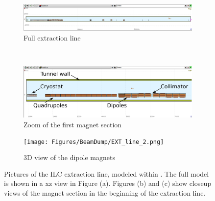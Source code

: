 \begin{figure}[h]
 \centering
  \begin{subfigure}[b]{\textwidth}
   \centering
    \includegraphics[width=\textwidth]{Figures/BeamDump/EXT_line.png}
   \caption{Full extraction line}
   \end{subfigure}\\
   \begin{subfigure}[b]{0.63\textwidth}
   \centering
    \includegraphics[width=\textwidth]{Figures/BeamDump/EXT_line_1.png}
   \caption{Zoom of the first magnet section}
   \end{subfigure}
   \hfill
    \begin{subfigure}[b]{0.35\textwidth}
   \centering
    \texttt{[image: Figures/BeamDump/EXT\_line\_2.png]}
   \caption{3D view of the dipole magnets}
   \end{subfigure}
   \caption[\fluka model of the ILC extraction line]{Pictures of the ILC extraction line, modeled within \flair.
   The full model is shown in a xz view in Figure (a).
   Figures (b) and (c) show closeup views of the magnet section in the beginning of the extraction line.}
   \label{fig:BeamDumps:EXT}
\end{figure} 


